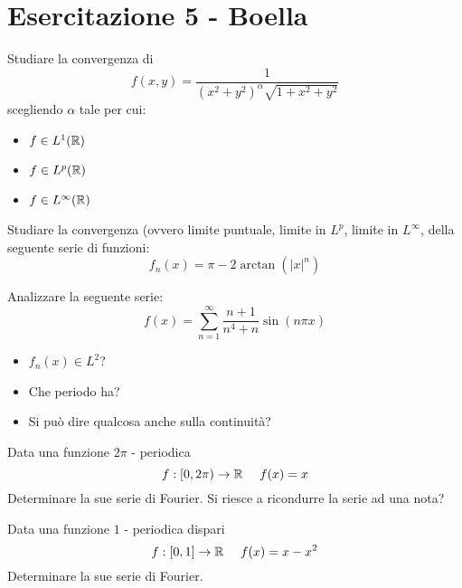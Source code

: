 \chapter{Esercitazione 5 - Boella}

\ParteEsercizi

\Esercizio{}

Studiare la convergenza di
\begin{equation*}
f(x, y) = \frac{1}{(x^{2} + y^{2})^{\alpha}\sqrt{1 + x^{2} + y^{2}}}
\end{equation*}
scegliendo $\alpha $ tale per cui:
\begin{itemize}
\item $f\in L^{1} (\mathbb{R})$
\item $f\in L^{p} (\mathbb{R})$
\item $f\in L^{\infty} (\mathbb{R})$
\end{itemize}

\Esercizio{}

Studiare la convergenza (ovvero limite puntuale, limite in $L^{p}$, limite in $L^{\infty}$, della seguente serie di funzioni:
\begin{equation*}
f_{n} (x) = \pi - 2\arctan (|x|^{n})
\end{equation*}

\Esercizio{}

Analizzare la seguente serie:
\begin{equation*}
f(x) = \sum^{\infty}_{n = 1}\frac{n + 1}{n^{4} + n}\sin (n\pi x)
\end{equation*}
\begin{itemize}
\item $f_{n} (x)\in L^{2}$?
\item Che periodo ha?
\item Si può dire qualcosa anche sulla continuità?
\end{itemize}

\Esercizio{}

Data una funzione $2\pi $ - periodica
\begin{equation*}
f:[ 0, 2\pi)\rightarrow \RR \ \ \ \ f(x) = x
\end{equation*}
Determinare la sue serie di Fourier. Si riesce a ricondurre la serie ad una nota?

\Esercizio{}

Data una funzione $1$ - periodica dispari
\begin{equation*}
f:[ 0, 1]\rightarrow \mathbb{R} \ \ \ \ f(x) = x - x^{2}
\end{equation*}
Determinare la sue serie di Fourier.

